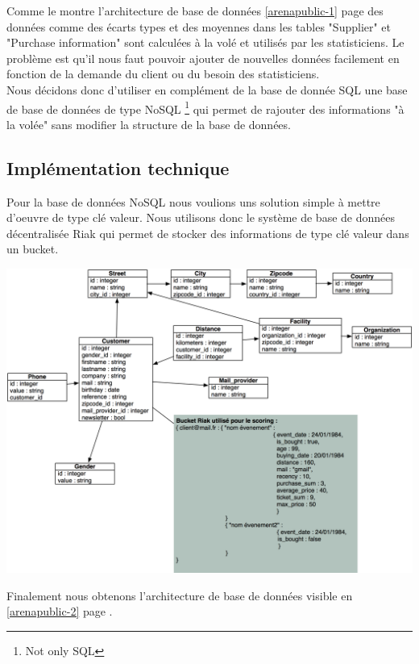 Comme le montre l'architecture de base de données \ref{arenapublic-1} page \pageref{arenapublic-1} des données comme des écarts types et des moyennes dans les tables "Supplier" et "Purchase information" sont calculées à la volé et utilisés par les statisticiens. Le problème est qu'il nous faut pouvoir ajouter de nouvelles données facilement en fonction de la demande du client ou du besoin des statisticiens.
\\

Nous décidons donc d'utiliser en complément de la base de donnée SQL une base de base de données de type NoSQL \footnote{Not only SQL} qui permet de rajouter des informations "à la volée" sans modifier la structure de la base de données. 

\subsection{Implémentation technique}
Pour la base de données NoSQL nous voulions uns solution simple à mettre d’oeuvre de type clé valeur. Nous utilisons donc le système de base de données décentralisée Riak qui permet de stocker des informations de type clé valeur dans un bucket.

\begin{center}
\includegraphics[scale=0.62]{images/arenapublic-2.png}
\label{arenapublic-2}
\end{center}

Finalement nous obtenons l'architecture de base de données visible en \ref{arenapublic-2} page \pageref{arenapublic-2}.

